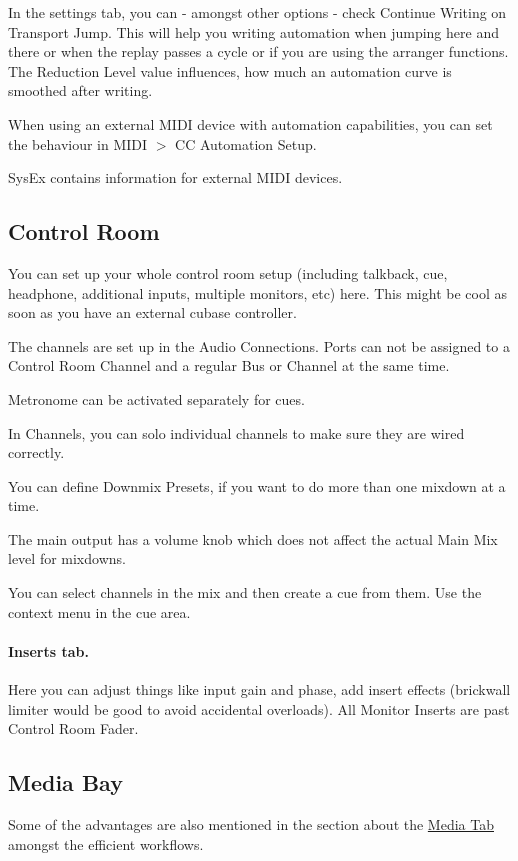 \documentclass[10pt]{article}
\begin{document}
In the settings tab, you can - amongst other options - check Continue Writing on Transport Jump. This will help you writing automation when jumping here and there or when the replay passes a cycle or if you are using the arranger functions. The Reduction Level value influences, how much an automation curve is smoothed after writing.

When using an external MIDI device with automation capabilities, you can set the behaviour in MIDI $>$ CC Automation Setup.

SysEx contains information for external MIDI devices.

\subsection{Control Room}

You can set up your whole control room setup (including talkback, cue, headphone, additional inputs, multiple monitors, etc) here. This might be cool as soon as you have an external cubase controller.

The channels are set up in the Audio Connections. Ports can not be assigned to a Control Room Channel and a regular Bus or Channel at the same time.

Metronome can be activated separately for cues.

In Channels, you can solo individual channels to make sure they are wired correctly.

You can define Downmix Presets, if you want to do more than one mixdown at a time.

The main output has a volume knob which does not affect the actual Main Mix level for mixdowns.

You can select channels in the mix and then create a cue from them. Use the context menu in the cue area.

\paragraph{Inserts tab.} Here you can adjust things like input gain and phase, add insert effects (brickwall limiter would be good to avoid accidental overloads). All Monitor Inserts are past Control Room Fader.

\subsection{Media Bay}\hypertarget{MediaBay}{}

Some of the advantages are also mentioned in the section about the \hyperlink{MediaTab}{Media Tab} amongst the efficient workflows.
\end{document}
